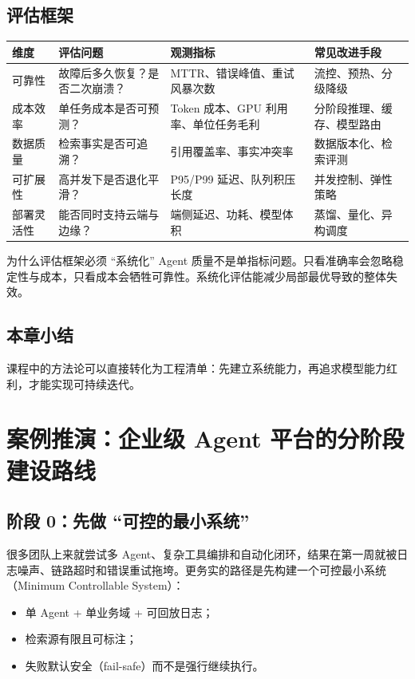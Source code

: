 \documentclass[a4paper]{article}
\begin{document}
\subsection{评估框架}
\begin{longtable}{p{2.4cm}p{3.7cm}p{3.6cm}p{3.2cm}}
\toprule
\textbf{维度} & \textbf{评估问题} & \textbf{观测指标} & \textbf{常见改进手段} \\
\midrule
可靠性 & 故障后多久恢复？是否二次崩溃？ & MTTR、错误峰值、重试风暴次数 & 流控、预热、分级降级 \\
成本效率 & 单任务成本是否可预测？ & Token 成本、GPU 利用率、单位任务毛利 & 分阶段推理、缓存、模型路由 \\
数据质量 & 检索事实是否可追溯？ & 引用覆盖率、事实冲突率 & 数据版本化、检索评测 \\
可扩展性 & 高并发下是否退化平滑？ & P95/P99 延迟、队列积压长度 & 并发控制、弹性策略 \\
部署灵活性 & 能否同时支持云端与边缘？ & 端侧延迟、功耗、模型体积 & 蒸馏、量化、异构调度 \\
\bottomrule
\end{longtable}

\begin{knowledgebox}{为什么评估框架必须 ``系统化''}
Agent 质量不是单指标问题。只看准确率会忽略稳定性与成本，只看成本会牺牲可靠性。系统化评估能减少局部最优导致的整体失效。
\end{knowledgebox}

\subsection{本章小结}
课程中的方法论可以直接转化为工程清单：先建立系统能力，再追求模型能力红利，才能实现可持续迭代。

\section{案例推演：企业级 Agent 平台的分阶段建设路线}

\subsection{阶段 0：先做 ``可控的最小系统''}
很多团队上来就尝试多 Agent、复杂工具编排和自动化闭环，结果在第一周就被日志噪声、链路超时和错误重试拖垮。更务实的路径是先构建一个可控最小系统（Minimum Controllable System）：
\begin{itemize}
    \item 单 Agent + 单业务域 + 可回放日志；
    \item 检索源有限且可标注；
    \item 失败默认安全（fail-safe）而不是强行继续执行。
\end{itemize}
\end{document}
